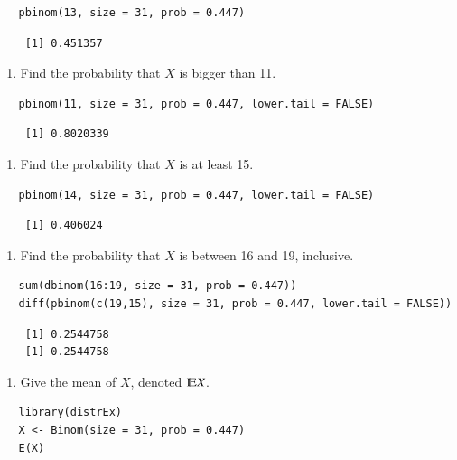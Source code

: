 \documentclass[captions=tableheading]{scrbook}
\begin{document}
\begin{xca}
\begin{verbatim}
   pbinom(13, size = 31, prob = 0.447)
\end{verbatim}

\begin{verbatim}
    [1] 0.451357
\end{verbatim}

\begin{enumerate}
\item Find the probability that \(X\) is bigger than 11.
\end{enumerate}

\begin{verbatim}
   pbinom(11, size = 31, prob = 0.447, lower.tail = FALSE)
\end{verbatim}

\begin{verbatim}
    [1] 0.8020339
\end{verbatim}

\begin{enumerate}
\item Find the probability that \(X\) is at least 15.
\end{enumerate}

\begin{verbatim}
   pbinom(14, size = 31, prob = 0.447, lower.tail = FALSE)
\end{verbatim}

\begin{verbatim}
    [1] 0.406024
\end{verbatim}

\begin{enumerate}
\item Find the probability that \(X\) is between 16 and 19, inclusive.
\end{enumerate}

\begin{verbatim}
   sum(dbinom(16:19, size = 31, prob = 0.447))
   diff(pbinom(c(19,15), size = 31, prob = 0.447, lower.tail = FALSE))
\end{verbatim}

\begin{verbatim}
    [1] 0.2544758
    [1] 0.2544758
\end{verbatim}

\begin{enumerate}
\item Give the mean of \(X\), denoted \(\mathrm{I\hspace{-1.5pt}E} X\).
\end{enumerate}

\begin{verbatim}
   library(distrEx)
   X <- Binom(size = 31, prob = 0.447)
   E(X)
\end{verbatim}


\end{xca}
\end{document}
